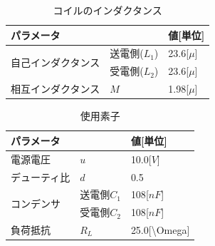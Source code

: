 \documentclass[12pt]{jarticle}
\begin{document}
\begin{table}[h]
	\centering
	\caption{コイルのインダクタンス}
	\label{tab:indact}
	\begin{tabular}{|l|l|l|}
		\hline
		\multicolumn{2}{|l|}{パラメータ}             & 値{[}単位{]}       \\ \hline
		\multirow{2}{*}{自己インダクタンス} & 送電側($L_1$) & 23.6{[}$\mu${]} \\ \cline{2-3} 
		& 受電側($L_2$) & 23.6{[}$\mu${]} \\ \hline
		相互インダクタンス                  & $M$        & 1.98{[}$\mu${]} \\ \hline
	\end{tabular}
\end{table}
\begin{table}[h]
	\centering
	\caption{使用素子}
	\label{tab:sosi}
	\begin{tabular}{|l|l|l|}
		\hline
		\multicolumn{2}{|l|}{パラメータ}       & 値{[}単位{]}                       \\ \hline
		電源電圧                   & $u$      & 10.0{[}$V${]}                   \\ \hline
		デューティ比                 & $d$      & 0.5                             \\ \hline
		\multirow{2}{*}{コンデンサ} & 送電側$C_1$ & 108{[}$nF${]}                   \\ \cline{2-3} 
		& 受電側$C_2$ & 108{[}$nF${]}                   \\ \hline
		負荷抵抗                   & $R_L$    & 25.0{[}\textbackslash{}Omega{]} \\ \hline
	\end{tabular}
\end{table}
\clearpage
\end{document}
